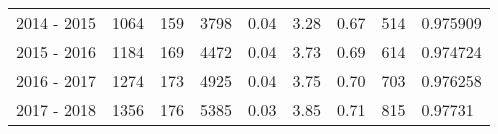 \begin{tabular}{lrrrrrrrl}
2014 - 2015 &                    1064 &         159 &     3798 &        0.04 &        3.28 &        0.67 &         514 &   0.975909 \\
2015 - 2016 &                    1184 &         169 &     4472 &        0.04 &        3.73 &        0.69 &         614 &   0.974724 \\
2016 - 2017 &                    1274 &         173 &     4925 &        0.04 &        3.75 &        0.70 &         703 &   0.976258 \\
2017 - 2018 &                    1356 &         176 &     5385 &        0.03 &        3.85 &        0.71 &         815 &    0.97731 \\
\bottomrule
\end{tabular}
